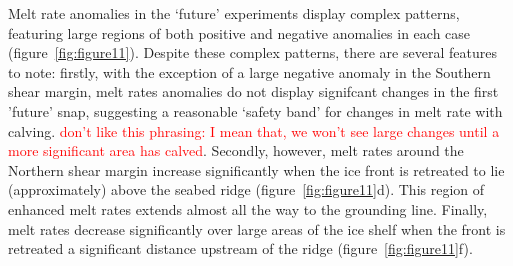 \documentclass[draft]{agujournal2019}
\newcommand{\red}[1]{\textcolor{red}{#1}}
\begin{document}
Melt rate anomalies in the `future' experiments display complex patterns, featuring large regions of both positive and negative anomalies in each case (figure~\ref{fig:figure11}). Despite these complex patterns, there are several features to note: firstly, with the exception of a large negative anomaly in the Southern shear margin, melt rates anomalies do not display signifcant changes in the first 'future' snap, suggesting a reasonable `safety band' for changes in melt rate with calving. \red{don't like this phrasing: I mean that, we won't see large changes until a more significant area has calved}. Secondly, however, melt rates around the Northern shear margin increase significantly when the ice front is retreated to lie (approximately) above the seabed ridge (figure~\ref{fig:figure11}d). This region of enhanced melt rates extends almost all the way to the grounding line.  Finally, melt rates decrease significantly over large areas of the ice shelf when the front is retreated a significant distance upstream of the ridge (figure~\ref{fig:figure11}f).
\end{document}
